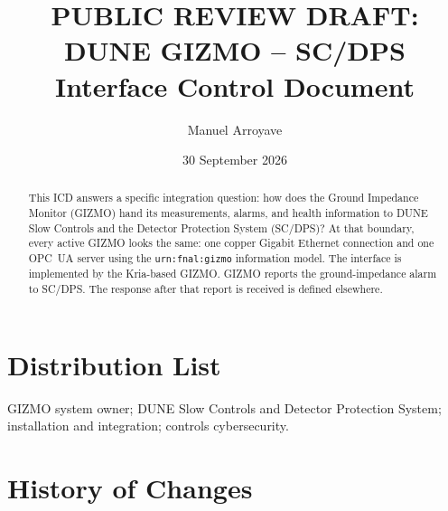 \documentclass{cernatlasnote}
\title{PUBLIC REVIEW DRAFT:\\ DUNE GIZMO -- SC/DPS\\ Interface Control Document}
\author{Manuel Arroyave}
\date{30 September 2026}
\newcommand{\code}[1]{\nolinkurl{#1}}
\begin{document}
\maketitle

\begin{center}
\end{center}

\begin{abstract}
This ICD answers a specific integration question: how does the Ground
Impedance Monitor (GIZMO) hand its measurements, alarms, and health information
to DUNE Slow Controls and the Detector Protection System (SC/DPS)? At that
boundary, every active GIZMO looks the same: one copper Gigabit Ethernet
connection and one OPC~UA server using the \code{urn:fnal:gizmo} information
model. The interface is implemented by the Kria-based GIZMO. GIZMO reports the
ground-impedance alarm to SC/DPS. The response after that report is received is
defined elsewhere.
\end{abstract}

\vfill
\makereviewtable
\clearpage

\section*{Distribution List}

GIZMO system owner; DUNE Slow Controls and Detector Protection System;
installation and integration; controls cybersecurity.

\section*{History of Changes}
\end{document}
